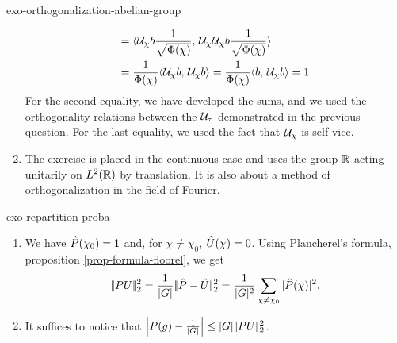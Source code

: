 \begin{correction}{exo-orthogonalization-abelian-group}
\begin{enumerate}
\begin{align*}
& = \langle \mathcal{U}_\chi b \frac{1}{\sqrt{\Phi (\chi)}},\,\mathcal{U}_\chi \mathcal{U}_\chi b \frac{1}{\sqrt{\Phi ( \chi)}}\rangle \\
& = \frac{1}{\Phi (\chi)} \langle \mathcal{U}_\chi b,\,\mathcal{U}_\chi b\rangle = \frac{1}{\Phi (\chi)} \langle b,\,\mathcal{U}_\chi b\rangle = 1.
\end{align*}
For the second equality, we have developed the sums, and we used the orthogonality relations between the $ \mathcal{U}_\tau $ demonstrated in the previous question. For the last equality, we used the fact that $ \mathcal{U}_\chi $ is self-vice.
\item {} The exercise  is placed in the continuous case and uses the group $ \mathbb{R} $ acting unitarily on $ L^2 (\mathbb{R}) $ by translation. It is also about a method of orthogonalization in the field of Fourier.
\end{enumerate}
\end{correction}
 
 
\begin{correction}{exo-repartition-proba}
\begin{enumerate}
\item We have $ \hat{P} (\chi_0) = 1 $ and, for $ \chi \neq \chi_0 $, $ \hat{U} (\chi) = 0 $. Using Plancherel's formula, proposition \ref{prop-formula-floorel}, we get
\begin{equation*}
|\!| PU |\!|_2^2 = \frac{1}{|G|} |\!| \hat{P} - \hat{U} |\!|_2^2 = \frac{1}{|G|^2} \sum_{\chi \neq \chi_0}{| \hat{P} (\chi) |^2}.
\end{equation*}
 
\item It suffices to notice that $ \left| P (g) - \frac{1}{|G|} \right| \leq |G| |\!| PU |\!|_2^2 $.
\end{enumerate}
\end{correction}
 
